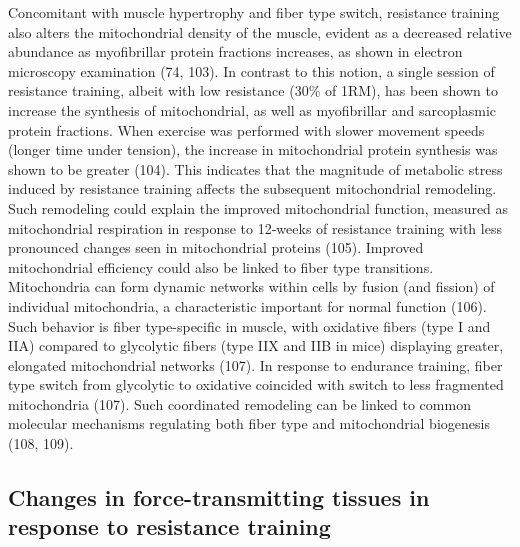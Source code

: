 \documentclass[twoside,10pt]{gihclass} %
\begin{document}
Concomitant with muscle hypertrophy and fiber type switch, resistance training also alters the mitochondrial density of the muscle, evident as a decreased relative abundance as myofibrillar protein fractions increases, as shown in electron microscopy examination
(74, 103).
In contrast to this notion, a single session of resistance training, albeit with low resistance (30\% of 1RM), has been shown to increase the synthesis of mitochondrial, as well as myofibrillar and sarcoplasmic protein fractions. When exercise was performed with slower movement speeds (longer time under tension), the increase in mitochondrial protein synthesis was shown to be greater
(104).
This indicates that the magnitude of metabolic stress induced by resistance training affects the subsequent mitochondrial remodeling.
Such remodeling could explain the improved mitochondrial function, measured as mitochondrial respiration in response to 12-weeks of resistance training with less pronounced changes seen in mitochondrial proteins
(105).
Improved mitochondrial efficiency could also be linked to fiber type transitions.
Mitochondria can form dynamic networks within cells by fusion (and fission) of individual mitochondria, a characteristic important for normal function
(106).
Such behavior is fiber type-specific in muscle, with oxidative fibers (type I and IIA) compared to glycolytic fibers (type IIX and IIB in mice) displaying greater, elongated mitochondrial networks
(107).
In response to endurance training, fiber type switch from glycolytic to oxidative coincided with switch to less fragmented mitochondria
(107).
Such coordinated remodeling can be linked to common molecular mechanisms regulating both fiber type and mitochondrial biogenesis
(108, 109).

\hypertarget{changes-in-force-transmitting-tissues-in-response-to-resistance-training}{%
\subsection{Changes in force-transmitting tissues in response to resistance training}\label{changes-in-force-transmitting-tissues-in-response-to-resistance-training}}
\end{document}
